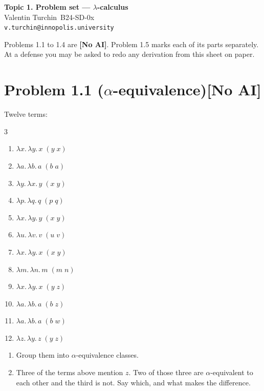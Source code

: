 \documentclass[11pt]{article}
\makeatletter
\newcommand{\noai}{\textcolor{BrickRed}{\textbf{[No AI]}}}
\newcommand{\studentname}{Valentin Turchin}
\newcommand{\studentgroup}{B24-SD-0x}
\newcommand{\studentemail}{v.turchin@innopolis.university}
\makeatother
\begin{document}
\begin{center}
  {\Large\bfseries Topic 1. Problem set --- $\lambda$-calculus}\\[0.5em]
  {\large\color{solution}\studentname\ \quad \studentgroup}\\[0.2em]
  {\small\color{solution}\texttt{\studentemail}}
\end{center}

\medskip
\noindent
Problems 1.1 to 1.4 are \noai. Problem 1.5 marks each of its parts separately.
At a
defense you may be asked to redo any derivation from this sheet on paper.

\bigskip

\section*{Problem 1.1 ($\alpha$-equivalence)\quad\normalsize\noai}

Twelve terms:

\begin{multicols}{3}
\begin{enumerate}\itemsep1pt
  \item $\lambda x.\, \lambda y.\, x\;(y\;x)$
  \item $\lambda a.\, \lambda b.\, a\;(b\;a)$
  \item $\lambda y.\, \lambda x.\, y\;(x\;y)$
  \item $\lambda p.\, \lambda q.\, q\;(p\;q)$
  \item $\lambda x.\, \lambda y.\, y\;(x\;y)$
  \item $\lambda u.\, \lambda v.\, v\;(u\;v)$
  \item $\lambda x.\, \lambda y.\, x\;(x\;y)$
  \item $\lambda m.\, \lambda n.\, m\;(m\;n)$
  \item $\lambda x.\, \lambda y.\, x\;(y\;z)$
  \item $\lambda a.\, \lambda b.\, a\;(b\;z)$
  \item $\lambda a.\, \lambda b.\, a\;(b\;w)$
  \item $\lambda z.\, \lambda y.\, z\;(y\;z)$
\end{enumerate}
\end{multicols}

\begin{enumerate}[label=(\alph*)]
  \item Group them into $\alpha$-equivalence classes.
  \item Three of the terms above mention $z$. Two of those three are
    $\alpha$-equivalent to each other and the third is not. Say which, and what
    makes the difference.
\end{enumerate}
\end{document}

